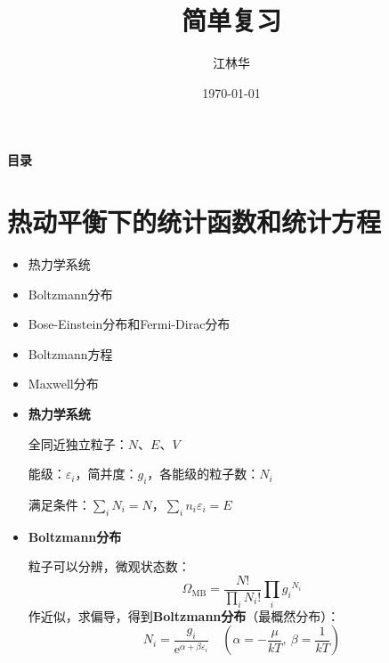 \documentclass{beamer}
\title{\textbf{简单复习}}\thispagestyle{empty}
\author{江林华}
\date{\today}
\renewcommand\epsilon{\varepsilon}
\let\sectiononly\section
\renewcommand{\section}[1]{
    \sectiononly{#1}
    \let\sectiontitle\relax
    \newcommand{\sectiontitle}{#1}
}
\newenvironment{slide}{
    \begin{frame}{\bfseries{\sectiontitle}}
}{
    \end{frame}
}
\begin{document}
\begin{frame}
    \maketitle
\end{frame}

\begin{frame}{\textbf{目录}}\thispagestyle{empty}
    \tableofcontents
\end{frame}

\section{热动平衡下的统计函数和统计方程}

\begin{slide}
    \addtocounter{framenumber}{-2}
    \begin{itemize}
        \item 热力学系统
        \item Boltzmann分布
        \item Bose-Einstein分布和Fermi-Dirac分布
        \item Boltzmann方程
        \item Maxwell分布
    \end{itemize}
\end{slide}

\begin{slide}
    \begin{itemize}
        \item \textbf{热力学系统}

        全同近独立粒子：$N$、$E$、$V$

        能级：$\epsilon_i$，简并度：$g_i$，各能级的粒子数：$N_i$

        满足条件：$\sum\limits_i N_i=N$，$\sum\limits_i n_i\epsilon_i=E$

        \item \textbf{Boltzmann分布}

        粒子可以分辨，微观状态数：
        \[
            \Omega_{\mathrm{MB}}=\frac{N!}{\prod\limits_i N_i!}\prod_i {g_i}^{N_i}
        \]
        作近似，求偏导，得到\textbf{Boltzmann分布}（最概然分布）：
        \[
            \boxed{
            N_i = \frac{g_i}{\mathrm{e}^{\alpha+\beta\epsilon_i}}\quad
            (\alpha=-\frac{\mu}{kT},\ \beta=\dfrac{1}{kT})
            }
        \]
    \end{itemize}
\end{slide}
\end{document}
